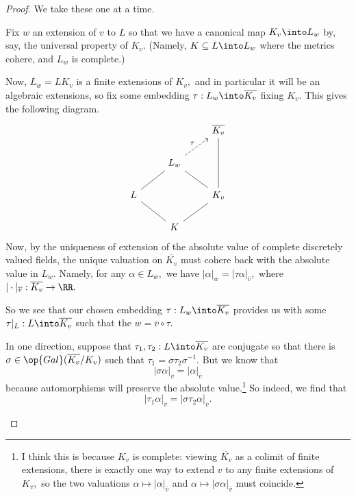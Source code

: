 \begin{proof}
	We take these one at a time.
	\begin{listalph}
		\item Fix $w$ an extension of $v$ to $L$ so that we have a canonical map $K_v\into L_w$ by, say, the universal property of $K_v.$ (Namely, $K\subseteq L\into L_w$ where the metrics cohere, and $L_w$ is complete.)

		Now, $L_w=LK_v$ is a finite extensions of $K_v,$ and in particular it will be an algebraic extensions, so fix some embedding $\tau:L_w\into\overline{K_v}$ fixing $K_v.$ This gives the following diagram.
		\[\begin{tikzcd}
			&& {\overline{K_v}} \\
			& {L_w} \\
			L && {K_v} \\
			& K
			\arrow["\tau", dashed, from=2-2, to=1-3]
			\arrow[no head, from=2-2, to=3-1]
			\arrow[no head, from=3-1, to=4-2]
			\arrow[no head, from=1-3, to=3-3]
			\arrow[no head, from=2-2, to=3-3]
			\arrow[no head, from=3-3, to=4-2]
		\end{tikzcd}\]
		Now, by the uniqueness of extension of the absolute value of complete discretely valued fields, the unique valuation on $\overline{K_v}$ must cohere back with the absolute value in $L_w.$ Namely, for any $\alpha\in L_w,$ we have $|\alpha|_w=|\tau\alpha|_{\overline v},$ where $|\cdot|_{\overline v}:\overline{K_v}\to\RR.$
		
		So we see that our chosen embedding $\tau:L_w\into\overline{K_v}$ provides us with some $\tau|_L:L\into\overline{K_v}$ such that the $w=\overline v\circ\tau.$

		\item In one direction, suppose that $\tau_1,\tau_2:L\into\overline{K_v}$ are conjugate so that there is $\sigma\in\op{Gal}(\overline{K_v}/K_v)$ such that $\tau_1=\sigma\tau_2\sigma^{-1}.$ But we know that
		\[|\sigma\alpha|_{\overline v}=|\alpha|_{\overline v}\]
		because automorphisms will preserve the absolute value.\footnote{I think this is because $K_v$ is complete: viewing $\overline{K_v}$ as a colimit of finite extensions, there is exactly one way to extend $v$ to any finite extensions of $K_v,$ so the two valuations $\alpha\mapsto|\alpha|_{\overline v}$ and $\alpha\mapsto|\sigma\alpha|_{\overline v}$ must coincide.} So indeed, we find that
		\[|\tau_1\alpha|_{\overline v}=\left|\sigma\tau_2\alpha\right|_{\overline v}.\]


\end{listalph}
\end{proof}
